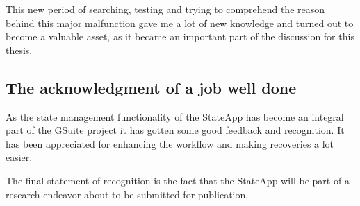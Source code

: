 \documentclass[english]{ifimaster}
\begin{document}
This new period of searching, testing and trying to comprehend the reason behind this major malfunction gave me a lot of new knowledge and turned out to become a valuable asset, as it became an important part of the discussion for this thesis.

\subsection{The acknowledgment of a job well done}
As the state management functionality of the StateApp has become an integral part of the GSuite project it has gotten some good feedback and recognition. It has been appreciated for enhancing the workflow and making recoveries a lot easier. 

The final statement of recognition is the fact that the StateApp will be part of a research endeavor about to be submitted for publication.

















\end{document}
